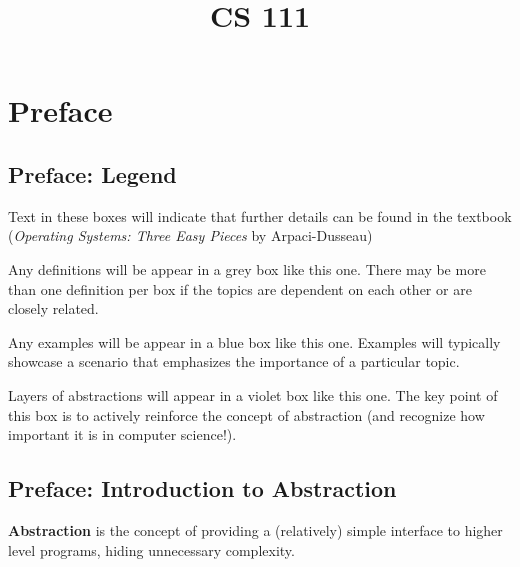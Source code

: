\documentclass{report}
\title{CS 111}
\date{}
\begin{document}
\maketitle

\tableofcontents
\newpage

\part*{Preface}
\chapter*{Preface: Legend}
\begin{tcolorbox}[colback=black!5!white,colframe=black!75!black,title=\textit{Operating Systems, Three Easy Pieces}]
  Text in these boxes will indicate that further details can be found in the textbook
  (\textit{Operating Systems: Three Easy Pieces} by Arpaci-Dusseau)
\end{tcolorbox}

\begin{tcolorbox}[title=Definitions]
  Any definitions will be appear in a grey box like this one. There may be more than one definition
  per box if the topics are dependent on each other or are closely related.
\end{tcolorbox}

\begin{tcolorbox}[colback=blue!5!white,colframe=black!75!blue,title=Examples]
  Any examples will be appear in a blue box like this one. Examples will typically showcase a scenario
  that emphasizes the importance of a particular topic.
\end{tcolorbox}

\begin{tcolorbox}[colback=violet!5!white,colframe=violet,title=Abstractions] 
  Layers of abstractions will appear in a violet box like this one. The key point of this box is to
  actively reinforce the concept of abstraction (and recognize how important it is in computer science!).
\end{tcolorbox}





\chapter*{Preface: Introduction to Abstraction}
\begin{tcolorbox}[title=Definition: Abstraction]
  \textbf{Abstraction} is the concept of providing a (relatively) simple interface to higher level
  programs, hiding unnecessary complexity.
\end{tcolorbox}
\end{document}

